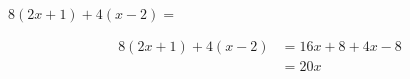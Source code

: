  $8(2x + 1) + 4(x - 2) =$

\begin{solutionbox}{2.5cm}
    \begin{align*}
        8(2x + 1) + 4(x - 2) & =16x+8+4x-8 \\
                             & =20x
    \end{align*}
\end{solutionbox}
